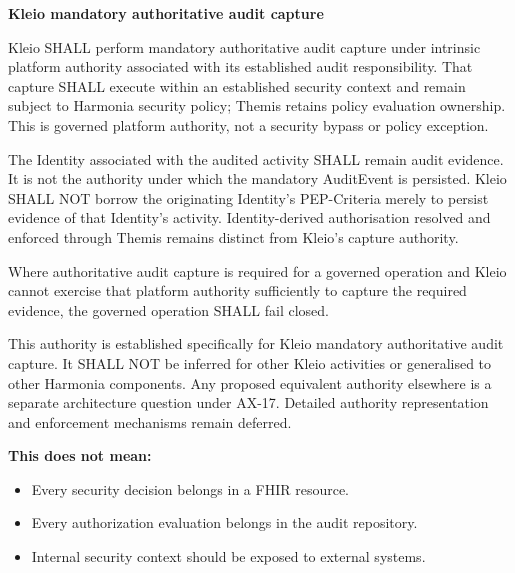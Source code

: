 \par\medskip\textbf{Kleio mandatory authoritative audit capture}\par


Kleio SHALL perform mandatory authoritative audit capture under intrinsic
platform authority associated with its established audit responsibility.
That capture SHALL execute within an established security context and remain
subject to Harmonia security policy; Themis retains policy evaluation ownership.
This is governed platform authority, not a security bypass or policy exception.



The Identity associated with the audited activity SHALL remain audit evidence.
It is not the authority under which the mandatory AuditEvent is persisted.
Kleio SHALL NOT borrow the originating Identity's PEP-Criteria merely to persist
evidence of that Identity's activity. Identity-derived authorisation resolved
and enforced through Themis remains distinct from Kleio's capture authority.



Where authoritative audit capture is required for a governed operation and
Kleio cannot exercise that platform authority sufficiently to capture the
required evidence, the governed operation SHALL fail closed.



This authority is established specifically for Kleio mandatory authoritative
audit capture. It SHALL NOT be inferred for other Kleio activities or generalised
to other Harmonia components. Any proposed equivalent authority elsewhere is
a separate architecture question under AX-17. Detailed authority representation
and enforcement mechanisms remain deferred.



\textbf{This does not mean:}



\begin{itemize}


\item Every security decision belongs in a FHIR resource.

\item Every authorization evaluation belongs in the audit repository.

\item Internal security context should be exposed to external systems.

\end{itemize}

